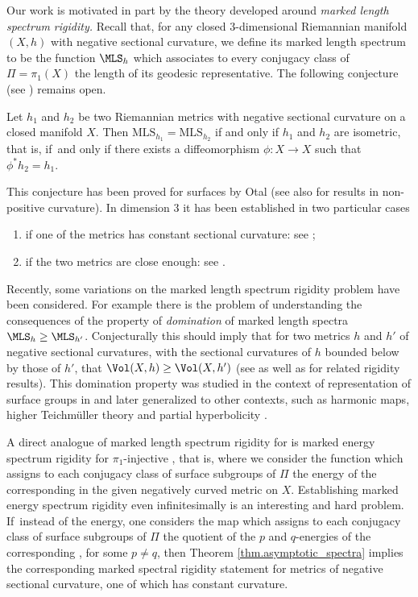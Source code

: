 Our work is motivated in part by the theory developed around \textit{marked length spectrum rigidity.} Recall that, for any closed $3$\nobreakdash-dimensional Riemannian manifold $(X,h)$ with negative sectional curvature, we define its marked length spectrum to be the function $\MLS_h$ which associates to every conjugacy class of $\Pi=\pi_1(X)$ the length of its geodesic representative. The following conjecture (see \cite[Prob.\,3.1]{BurnsKatok}) remains open.
\begin{conjecture}
Let $h_1$ and $h_2$ be two Riemannian metrics with negative sectional curvature on a closed manifold $X$. Then $\mathrm{MLS}_{h_1}=\mathrm{MLS}_{h_2}$ if and only if $h_1$ and $h_2$ are isometric, that is, if~and only if there exists a diffeomorphism $\phi:X\to X$ such that $\phi^\ast h_2=h_1$.
\end{conjecture}

This conjecture has been proved for surfaces by Otal \cite{Otal} (see also \cite{Croke} for results in non-positive curvature). In dimension $3$ it has been established in two particular cases
\begin{enumerate}
\item if one of the metrics has constant sectional curvature: see \cite{besson1996minimal,HamenstadtMLS};
\item if the two metrics are close enough: see \cite{GuillarmouLefeuvre}.
\end{enumerate}

Recently, some variations on the marked length spectrum rigidity problem have been considered. For example there is the problem of understanding the consequences of the property of \emph{domination} of marked length spectra $\MLS_h\geq\MLS_{h'}$. Conjecturally this should imply that for two metrics $h$ and $h'$ of negative sectional curvatures, with the sectional curvatures of $h$ bounded below by those of $h'$, that $\Vol(X,h)\geq\Vol(X,h')$ (see \cite{Croke_Dairbekov,Croke_Dairbekov_Sharafutdinov} as well as \cite{Gogolev_Reber} for related rigidity results). This domination property was studied in the context of representation of surface groups in \cite{Deroin_Tholozan,Gueritaud_Kassel_Wolff} and later generalized to other contexts, such as harmonic maps, higher Teichmüller theory and partial hyperbolicity \cite{Alvarez_Yang,Barman_Gupta,Dai_Li,Li,Sagman}.

A direct analogue of marked length spectrum rigidity for \ksurfaces is marked energy spectrum rigidity for $\pi_1$-injective \ksurfaces, that is, where we consider the function which assigns to each conjugacy class of surface subgroups of $\Pi$ the energy of the corresponding \ksurface in the given negatively curved metric on $X$. Establishing marked energy spectrum rigidity even infinitesimally is an interesting and hard problem. If~instead of the energy, one considers the map which assigns to each conjugacy class of surface subgroups of $\Pi$ the quotient of the $p$ and $q$-energies of the corresponding \ksurface, for some $p \neq q$, then Theorem \ref{thm.asymptotic_spectra} implies the corresponding marked spectral rigidity statement for metrics of negative sectional curvature, one of which has constant curvature.

